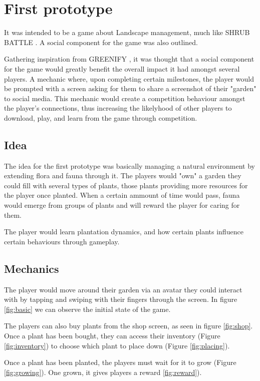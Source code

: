 \section{First prototype}

It was intended to be a game about Landscape management, much like 
SHRUB BATTLE \cite{Depigny2007}. A social component for the
game was also outlined.

Gathering inspiration from GREENIFY \cite{Lee2013}, it was thought that
a social component for the game would greatly benefit the overall impact
it had amongst several players. A mechanic where, upon completing
certain milestones, the player would be prompted with a screen asking
for them to share a screenshot of their "garden" to social media. This
mechanic would create a competition behaviour amongst the player's connections,
thus increasing the likelyhood of other players to download, play, and learn
from the game through competition.

\subsection{Idea}
The idea for the first prototype was basically managing a natural environment
by extending flora and fauna through it. The players would "own" a garden
they could fill with several types of plants, those plants providing
more resources for the player once planted. When a certain ammount of time
would pass, fauna would emerge from groups of plants and will reward
the player for caring for them.

The player would learn plantation dynamics, and how certain plants influence
certain behaviours through gameplay.

\subsection{Mechanics}
The player would move around their garden via an avatar they could interact
with by tapping and swiping with their fingers through the screen. In figure
\ref{fig:basic} we can observe the initial state of the game.

The players can also buy plants from the shop screen, as seen in
figure \ref{fig:shop}. Once a plant has been bought, they can
access their inventory (Figure \ref{fig:inventory}) to choose which
plant to place down (Figure \ref{fig:placing}).

Once a plant has been planted, the players must wait for
it to grow (Figure \ref{fig:growing}). One grown, it gives players a reward
\ref{fig:reward}).

